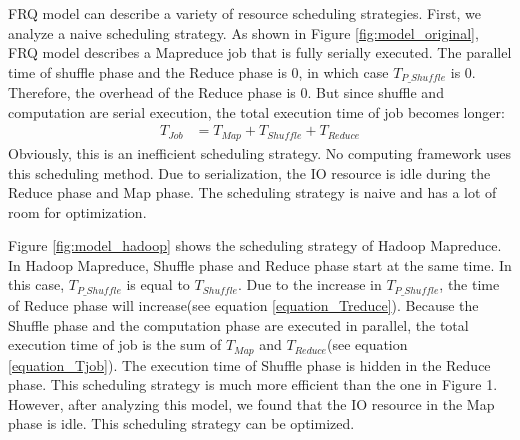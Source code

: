 {FRQ model can describe a variety of resource scheduling strategies. First, we analyze a naive scheduling strategy. As shown in Figure \ref{fig:model_original}, FRQ model describes a Mapreduce job that is fully serially executed. The parallel time of shuffle phase and the Reduce phase is \(0\), in which case \(T_{P\_Shuffle}\) is \(0\). Therefore, the overhead of the Reduce phase is 0. But since shuffle and computation are serial execution, the total execution time of job becomes longer:
\begin{equation}
\label{equation_Tjob2}
\begin{aligned}
    T_{Job} &= T_{Map} + T_{Shuffle} + T_{Reduce}
\end{aligned}
\end{equation}
Obviously, this is an inefficient scheduling strategy. No computing framework uses this scheduling method. Due to serialization, the IO resource is idle during the Reduce phase and Map phase. The scheduling strategy is naive and has a lot of room for optimization.

Figure \ref{fig:model_hadoop} shows the scheduling strategy of Hadoop Mapreduce. In Hadoop Mapreduce, Shuffle phase and Reduce phase start at the same time. In this case, \(T_{P\_Shuffle}\) is equal to \(T_{Shuffle}\). Due to the increase in \(T_{P\_Shuffle}\), the time of Reduce phase will increase(see equation \ref{equation_Treduce}). Because the Shuffle phase and the computation phase are executed in parallel, the total execution time of job is the sum of \(T_{Map}\) and \(T_{Reduce}\)(see equation \ref{equation_Tjob}). The execution time of Shuffle phase is hidden in the Reduce phase. This scheduling strategy is much more efficient than the one in Figure 1. However, after analyzing this model, we found that the IO resource in the Map phase is idle. This scheduling strategy can be optimized.

}

